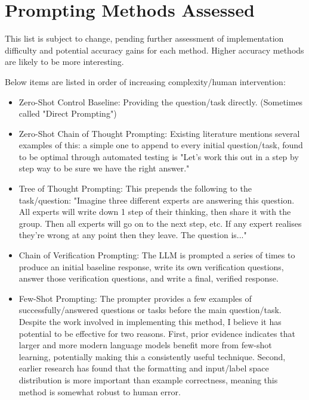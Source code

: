 \documentclass[11pt]{article}
\begin{document}
\section*{Prompting Methods Assessed}

This list is subject to change, pending further assessment of implementation difficulty and potential accuracy gains for each method. Higher accuracy methods are likely to be more interesting.

Below items are listed in order of increasing complexity/human intervention:

\begin{itemize}
  \item Zero-Shot Control Baseline: Providing the question/task directly. (Sometimes called "Direct Prompting")
  \item Zero-Shot Chain of Thought Prompting: Existing literature mentions several examples of this: a simple one to append to every initial question/task, found to be optimal through automated testing is "Let's work this out in a step by step way to be sure we have the right answer." \cite{hebenstreit_automatically_2023, zhou_large_2022}
  \item Tree of Thought Prompting: This prepends the following to the task/question: "Imagine three different experts are answering this question. All experts will write down 1 step of their thinking, then share it with the group. Then all experts will go on to the next step, etc. If any expert realises they're wrong at any point then they leave. The question is..." \cite{hulbert_using_2023}
  \item Chain of Verification Prompting: The LLM is prompted a series of times to produce an initial baseline response, write its own verification questions, answer those verification questions, and write a final, verified response. \cite{dhuliawala_chain--verification_2023}
  \item Few-Shot Prompting: The prompter provides a few examples of successfully/answered questions or tasks before the main question/task. Despite the work involved in implementing this method, I believe it has potential to be effective for two reasons. First, prior evidence indicates that larger and more modern language models benefit more from few-shot learning, potentially making this a consistently useful technique. \cite{brown_language_2020} Second, earlier research has found that the formatting and input/label space distribution is more important than example correctness, meaning this method is somewhat robust to human error. \cite{min_rethinking_2022}
\end{itemize}
\end{document}
